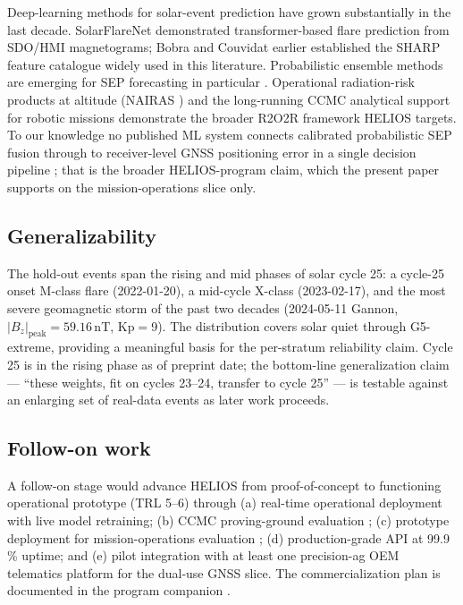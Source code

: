 \documentclass[11pt,letterpaper]{article}
\begin{document}
Deep-learning methods for solar-event prediction have grown substantially in
the last decade.  SolarFlareNet \cite{sun2023} demonstrated transformer-based
flare prediction from SDO/HMI magnetograms; Bobra and Couvidat
\cite{bobra2015} earlier established the SHARP feature catalogue widely used
in this literature.  Probabilistic ensemble methods are emerging for SEP
forecasting in particular \cite{poduval2023}.  Operational radiation-risk
products at altitude (NAIRAS \cite{mertens2025}) and the long-running
CCMC analytical support for robotic missions \cite{colladovega2023}
demonstrate the broader R2O2R framework HELIOS targets.  To our knowledge
no published ML system connects calibrated probabilistic SEP fusion through
to receiver-level GNSS positioning error in a single decision pipeline
\cite{ntrs_brazil2025,seesaw2022}; that is the broader HELIOS-program
claim, which the present paper supports on the mission-operations slice
only.

\subsection{Generalizability}

The hold-out events span the rising and mid phases of solar cycle 25:
a cycle-25 onset M-class flare (2022-01-20), a mid-cycle X-class
(2023-02-17), and the most severe geomagnetic storm of the past two
decades (2024-05-11 Gannon, $|B_z|_\mathrm{peak} = 59.16$\,nT,
Kp$=$9).  The distribution covers solar quiet
through G5-extreme, providing a meaningful basis for the per-stratum
reliability claim.  Cycle 25 is in the rising phase as of preprint date;
the bottom-line generalization claim --- ``these weights, fit on cycles
23--24, transfer to cycle 25'' --- is testable against an enlarging set
of real-data events as later work proceeds.

\subsection{Follow-on work}

A follow-on stage would advance HELIOS from proof-of-concept to functioning
operational prototype (TRL 5--6) through (a) real-time operational
deployment with live model retraining; (b) CCMC proving-ground evaluation
\cite{whitman2023,whitman2024}; (c) prototype deployment for mission-operations evaluation
\cite{m2mswao};
(d) production-grade API at 99.9\,\% uptime; and (e) pilot integration
with at least one precision-ag OEM telematics platform for the dual-use
GNSS slice.  The commercialization plan is documented in
the program companion \cite{helios_internal}.
\end{document}
